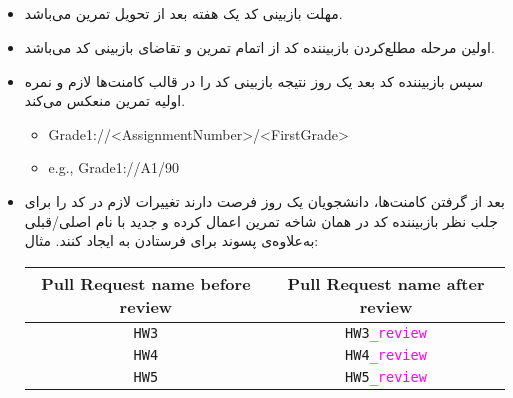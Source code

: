 \subsection{}
\begin{itemize}
	\item
	      مهلت بازبینی کد یک هفته بعد از تحویل تمرین می‌باشد.
	\item
	      اولین مرحله مطلع‌کردن بازبیننده کد از اتمام تمرین و تقاضای بازبینی کد می‌باشد.
	\item
	      سپس بازبیننده کد بعد یک روز نتیجه بازبینی کد را در قالب کامنت‌ها لازم و نمره اولیه تمرین منعکس می‌کند.
	      \begin{latin}
		      \begin{itemize}
			      \item
			            Grade1://<AssignmentNumber>/<FirstGrade>
			      \item
			            e.g., Grade1://A1/90
		      \end{itemize}
	      \end{latin}
	\item
	      بعد از گرفتن کامنت‌ها، دانشجویان یک روز فرصت دارند تغییرات لازم در کد را برای جلب نظر بازبیننده کد در همان شاخه تمرین اعمال کرده و
	      جدید با  نام
	      اصلی/قبلی به‌علاوه‌ی پسوند
	      برای فرستادن به
		ایجاد کنند.
		مثال:
		\begin{latin}		
			\begin{table}[ht]
				\centering
				\begin{tabular}{c|c}
				\rowcolor[HTML]{CBCEFB} 
				Pull Request name before review & Pull Request name after review \\ \hline
				\rowcolor[HTML]{EFEFEF} 
				\texttt{HW3} & \texttt{HW3\textcolor{magenta}{\_review}} \\ \hline
				\texttt{HW4} & \texttt{HW4\textcolor{magenta}{\_review}} \\ \hline
				\rowcolor[HTML]{EFEFEF} 
				\texttt{HW5} & \texttt{HW5\textcolor{magenta}{\_review}}
				\end{tabular}
				\end{table}
		\end{latin}


\end{itemize}
